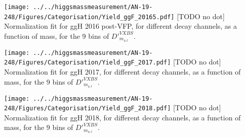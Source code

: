 \begin{multiFigure}
    \centering
        \texttt{[image: ../../higgsmassmeasurement/AN-19-248/Figures/Categorisation/Yield\_ggF\_20165.pdf]}
        [TODO no dot]
        {Normalization fit for ggH 2016 post-VFP, for different decay channels, as a function of mass, for the 9 bins of $D'^{VXBS}_{m_{4\ell}}$.}
    \label{signal_normalization_20165}
\end{multiFigure}
\begin{multiFigure}
    \centering
		\texttt{[image: ../../higgsmassmeasurement/AN-19-248/Figures/Categorisation/Yield\_ggF\_2017.pdf]}
        [TODO no dot]
        {Normalization fit for ggH 2017, for different decay channels, as a function of mass, for the 9 bins of $D'^{VXBS}_{m_{4\ell}}$.}
    \label{signal_normalization_2017}
\end{multiFigure}
\begin{multiFigure}
    \centering
		\texttt{[image: ../../higgsmassmeasurement/AN-19-248/Figures/Categorisation/Yield\_ggF\_2018.pdf]}
        [TODO no dot]
        {Normalization fit for ggH 2018, for different decay channels, as a function of mass, for the 9 bins of $D'^{VXBS}_{m_{4\ell}}$.}
    \label{signal_normalization_2018}
\end{multiFigure}

